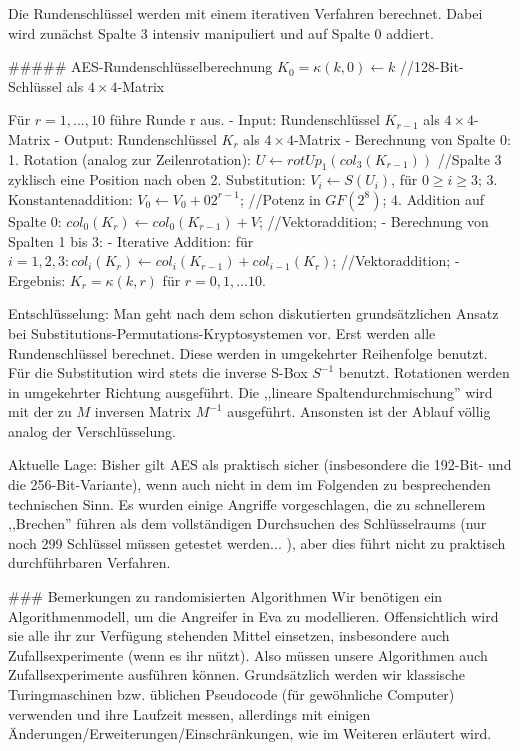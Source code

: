 \documentclass[a4paper]{article}
\begin{document}
\begin{multicols}{3}
Die Rundenschlüssel werden mit einem iterativen Verfahren berechnet. Dabei wird zunächst Spalte 3 intensiv manipuliert und auf Spalte 0 addiert.

##### AES-Rundenschlüsselberechnung
$K_0 =\kappa (k,0)\leftarrow k$ //128-Bit-Schlüssel als $4\times 4$-Matrix

Für $r= 1,..., 10$ führe Runde r aus.
- Input: Rundenschlüssel $K_{r-1}$ als $4\times 4$-Matrix
- Output: Rundenschlüssel $K_r$ als $4\times 4$-Matrix
- Berechnung von Spalte 0:
    1. Rotation (analog zur Zeilenrotation): $U\leftarrow rotUp_1(col_3(K_{r-1}))$ //Spalte 3 zyklisch eine Position nach oben
    2. Substitution: $V_i\leftarrow S(U_i)$, für $0\geq i\geq 3$;
    3. Konstantenaddition: $V_0\leftarrow V_0+02^{r-1}$; //Potenz in $GF(2^8)$;
    4. Addition auf Spalte 0: $col_0(K_r)\leftarrow col_0(K_{r-1})+V$; //Vektoraddition;
- Berechnung von Spalten 1 bis 3:
  - Iterative Addition: für $i=1,2,3: col_i(K_r)\leftarrow col_i(K_{r-1})+col_{i-1}(K_r)$; //Vektoraddition;
- Ergebnis: $K_r=\kappa (k,r)$ für $r=0,1,...10$.

Entschlüsselung: 
Man geht nach dem schon diskutierten grundsätzlichen Ansatz bei Substitutions-Permutations-Kryptosystemen vor. Erst werden alle Rundenschlüssel berechnet. Diese werden in umgekehrter Reihenfolge benutzt. Für die Substitution wird stets die inverse S-Box $S^{-1}$ benutzt. Rotationen werden in umgekehrter Richtung ausgeführt. Die ,,lineare Spaltendurchmischung'' wird mit der zu $M$ inversen Matrix $M^{-1}$ ausgeführt. Ansonsten ist der Ablauf völlig analog der Verschlüsselung.

Aktuelle Lage: 
Bisher gilt AES als praktisch sicher (insbesondere die 192-Bit- und die 256-Bit-Variante), wenn auch nicht in dem im Folgenden zu besprechenden technischen Sinn. Es wurden einige Angriffe vorgeschlagen, die zu schnellerem ,,Brechen'' führen als dem vollständigen Durchsuchen des Schlüsselraums (nur noch 299 Schlüssel müssen getestet werden... ), aber dies führt nicht zu praktisch durchführbaren Verfahren.

### Bemerkungen zu randomisierten Algorithmen
Wir benötigen ein Algorithmenmodell, um die Angreifer in Eva zu modellieren. Offensichtlich wird sie alle ihr zur Verfügung stehenden Mittel einsetzen, insbesondere auch Zufallsexperimente (wenn es ihr nützt). Also müssen unsere Algorithmen auch Zufallsexperimente ausführen können. Grundsätzlich werden wir klassische Turingmaschinen bzw. üblichen Pseudocode (für gewöhnliche Computer) verwenden und ihre Laufzeit messen, allerdings mit einigen Änderungen/Erweiterungen/Einschränkungen, wie im Weiteren erläutert wird.


\end{multicols}
\end{document}
